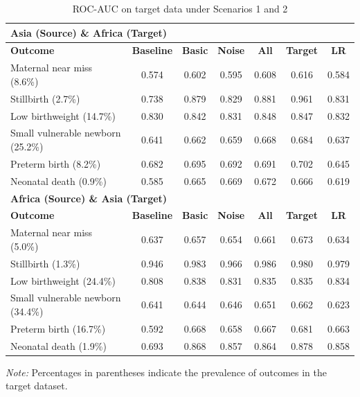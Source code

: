 \documentclass[fleqn,10pt]{wlscirep}
\begin{document}
\begin{table}[htbp]
\centering
\footnotesize
\begin{threeparttable}
\caption{ROC-AUC on target data under Scenarios 1 and 2}
\label{table:source}
\begin{tabular}{l c c c c c c}
\toprule
\multicolumn{7}{l}{\textbf{Asia (Source) \& Africa (Target)}} \\
\midrule
\textbf{Outcome} & \textbf{Baseline} & \textbf{Basic} & \textbf{Noise} & \textbf{All} & \textbf{Target} & \textbf{LR} \\
\midrule
Maternal near miss (8.6\%)    & 0.574 & 0.602 & 0.595 & 0.608 & 0.616 & 0.584  \\
Stillbirth (2.7\%)           & 0.738 & 0.879 & 0.829 & 0.881 & 0.961 & 0.831  \\
Low birthweight (14.7\%)     & 0.830 & 0.842 & 0.831 & 0.848 & 0.847 & 0.832  \\
Small vulnerable newborn (25.2\%) & 0.641 & 0.662 & 0.659 & 0.668 & 0.684 & 0.637 \\
Preterm birth (8.2\%)        & 0.682 & 0.695 & 0.692 & 0.691 & 0.702 & 0.645 \\
Neonatal death (0.9\%)       & 0.585 & 0.665 & 0.669 & 0.672 & 0.666 & 0.619 \\
\midrule
\multicolumn{7}{l}{\textbf{Africa (Source) \& Asia (Target)}} \\
\midrule
\textbf{Outcome} & \textbf{Baseline} & \textbf{Basic} & \textbf{Noise} & \textbf{All} & \textbf{Target} & \textbf{LR} \\
\midrule
Maternal near miss (5.0\%)    & 0.637 & 0.657 & 0.654 & 0.661 & 0.673 & 0.634  \\
Stillbirth (1.3\%)           & 0.946 & 0.983 & 0.966 & 0.986 & 0.980 & 0.979  \\
Low birthweight (24.4\%)     & 0.808 & 0.838 & 0.831 & 0.835 & 0.835 & 0.834  \\
Small vulnerable newborn (34.4\%) & 0.641 & 0.644 & 0.646 & 0.651 & 0.662 & 0.623 \\
Preterm birth (16.7\%)       & 0.592 & 0.668 & 0.658 & 0.667 & 0.681 & 0.663 \\
Neonatal death (1.9\%)       & 0.693 & 0.868 & 0.857 & 0.864 & 0.878 & 0.858 \\
\bottomrule
\end{tabular}
\begin{tablenotes}
\scriptsize
\item \textit{Note:} Percentages in parentheses indicate the prevalence of outcomes in the target dataset.
\end{tablenotes}
\end{threeparttable}
\end{table}
\end{document}
